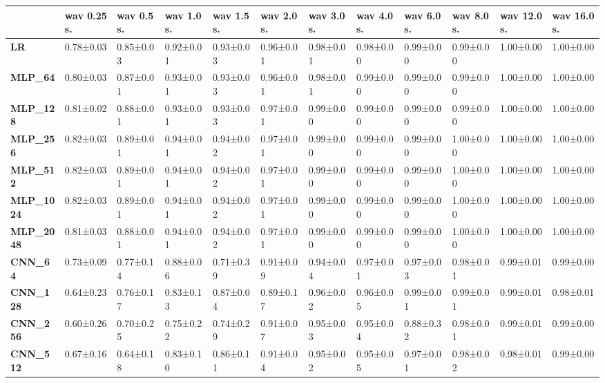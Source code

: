 \begin{tabular}{llllllllllll}
\toprule
{} & wav 0.25 s. & wav 0.5 s. & wav 1.0 s. & wav 1.5 s. & wav 2.0 s. & wav 3.0 s. & wav 4.0 s. & wav 6.0 s. & wav 8.0 s. & wav 12.0 s. & wav 16.0 s. \\
\midrule
\textbf{LR            } &   0.78±0.03 &  0.85±0.03 &  0.92±0.01 &  0.93±0.03 &  0.96±0.01 &  0.98±0.01 &  0.98±0.00 &  0.99±0.00 &  0.99±0.00 &   1.00±0.00 &   1.00±0.00 \\
\textbf{MLP\_64        } &   0.80±0.03 &  0.87±0.01 &  0.93±0.01 &  0.93±0.03 &  0.96±0.01 &  0.98±0.01 &  0.99±0.00 &  0.99±0.00 &  0.99±0.00 &   1.00±0.00 &   1.00±0.00 \\
\textbf{MLP\_128       } &   0.81±0.02 &  0.88±0.01 &  0.93±0.01 &  0.93±0.03 &  0.97±0.01 &  0.99±0.00 &  0.99±0.00 &  0.99±0.00 &  0.99±0.00 &   1.00±0.00 &   1.00±0.00 \\
\textbf{MLP\_256       } &   0.82±0.03 &  0.89±0.01 &  0.94±0.01 &  0.94±0.02 &  0.97±0.01 &  0.99±0.00 &  0.99±0.00 &  0.99±0.00 &  1.00±0.00 &   1.00±0.00 &   1.00±0.00 \\
\textbf{MLP\_512       } &   0.82±0.03 &  0.89±0.01 &  0.94±0.01 &  0.94±0.02 &  0.97±0.01 &  0.99±0.00 &  0.99±0.00 &  0.99±0.00 &  1.00±0.00 &   1.00±0.00 &   1.00±0.00 \\
\textbf{MLP\_1024      } &   0.82±0.03 &  0.89±0.01 &  0.94±0.01 &  0.94±0.02 &  0.97±0.01 &  0.99±0.00 &  0.99±0.00 &  0.99±0.00 &  1.00±0.00 &   1.00±0.00 &   1.00±0.00 \\
\textbf{MLP\_2048      } &   0.81±0.03 &  0.88±0.01 &  0.94±0.01 &  0.94±0.02 &  0.97±0.01 &  0.99±0.00 &  0.99±0.00 &  0.99±0.00 &  1.00±0.00 &   1.00±0.00 &   1.00±0.00 \\
\textbf{CNN\_64        } &   0.73±0.09 &  0.77±0.14 &  0.88±0.06 &  0.71±0.39 &  0.91±0.09 &  0.94±0.04 &  0.97±0.01 &  0.97±0.03 &  0.98±0.01 &   0.99±0.01 &   0.99±0.00 \\
\textbf{CNN\_128       } &   0.64±0.23 &  0.76±0.17 &  0.83±0.13 &  0.87±0.04 &  0.89±0.17 &  0.96±0.02 &  0.96±0.05 &  0.99±0.01 &  0.99±0.01 &   0.99±0.01 &   0.98±0.01 \\
\textbf{CNN\_256       } &   0.60±0.26 &  0.70±0.25 &  0.75±0.22 &  0.74±0.29 &  0.91±0.07 &  0.95±0.03 &  0.95±0.04 &  0.88±0.32 &  0.98±0.01 &   0.99±0.01 &   0.99±0.00 \\
\textbf{CNN\_512       } &   0.67±0.16 &  0.64±0.18 &  0.83±0.10 &  0.86±0.11 &  0.91±0.04 &  0.95±0.02 &  0.95±0.05 &  0.97±0.01 &  0.98±0.02 &   0.98±0.01 &   0.99±0.00 \\

\end{tabular}
